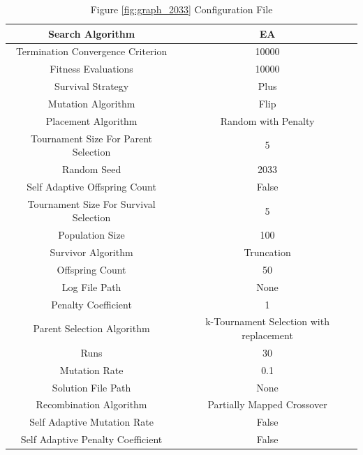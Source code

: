 \documentclass{standalone}
\begin{document}
\begin{table}[!htb]
	\centering
	\caption{Figure \ref{fig:graph_2033} Configuration File}
	\label{tab:graph_2033}
	\begin{tabular}{| c | c |}
		\hline
		Search Algorithm		& EA		 \\
		\hline
		Termination Convergence Criterion		& 10000		 \\
		\hline
		Fitness Evaluations		& 10000		 \\
		\hline
		Survival Strategy		& Plus		 \\
		\hline
		Mutation Algorithm		& Flip		 \\
		\hline
		Placement Algorithm		& Random with Penalty		 \\
		\hline
		Tournament Size For Parent Selection		& 5		 \\
		\hline
		Random Seed		& 2033		 \\
		\hline
		Self Adaptive Offspring Count		& False		 \\
		\hline
		Tournament Size For Survival Selection		& 5		 \\
		\hline
		Population Size		& 100		 \\
		\hline
		Survivor Algorithm		& Truncation		 \\
		\hline
		Offspring Count		& 50		 \\
		\hline
		Log File Path		& None		 \\
		\hline
		Penalty Coefficient		& 1		 \\
		\hline
		Parent Selection Algorithm		& k-Tournament Selection with replacement		 \\
		\hline
		Runs		& 30		 \\
		\hline
		Mutation Rate		& 0.1		 \\
		\hline
		Solution File Path		& None		 \\
		\hline
		Recombination Algorithm		& Partially Mapped Crossover		 \\
		\hline
		Self Adaptive Mutation Rate		& False		 \\
		\hline
		Self Adaptive Penalty Coefficient		& False		 \\
		\hline
	\end{tabular}
\end{table}
\end{document}
